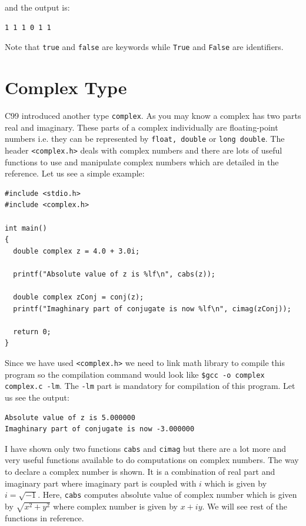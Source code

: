 and the output is:

\begin{verbatim}
1 1 1 0 1 1
\end{verbatim}

Note that \texttt{true} and \texttt{false} are keywords while \texttt{True} and
\texttt{False} are identifiers.

\section{Complex Type}
C99 introduced another type \texttt{complex}. As you may know a complex has two
parts real and imaginary. These parts of a complex individually are
floating-point numbers i.e. they can be represented by \texttt{float, double}
or \texttt{long double}. The header \texttt{<complex.h>} deals with complex
numbers and there are lots of useful functions to use and manipulate complex
numbers which are detailed in the reference. Let us see a simple example:

\begin{verbatim}
#include <stdio.h>
#include <complex.h>

int main()
{
  double complex z = 4.0 + 3.0i;

  printf("Absolute value of z is %lf\n", cabs(z));

  double complex zConj = conj(z);
  printf("Imaghinary part of conjugate is now %lf\n", cimag(zConj));

  return 0;
}
\end{verbatim}

Since we have used \texttt{<complex.h>} we need to link math library to compile
this program so the compilation command would look like \texttt{\$gcc -o complex
complex.c -lm}. The \texttt{-lm} part is mandatory for compilation of this
program. Let us see the output:

\begin{verbatim}
Absolute value of z is 5.000000
Imaghinary part of conjugate is now -3.000000
\end{verbatim}

I have shown only two functions \texttt{cabs} and \texttt{cimag} but there are
a lot more and very useful functions available to do computations on complex
numbers. The way to declare a complex number is shown. It is a combination of
real part and imaginary part where imaginary part is coupled with $i$ which is
given by $i = \sqrt{-1}$. Here, \texttt{cabs} computes absolute value of
complex number which is given by $\sqrt{x^2 + y^2}$ where complex number is
given by $x + iy$. We will see rest of the functions in reference.

